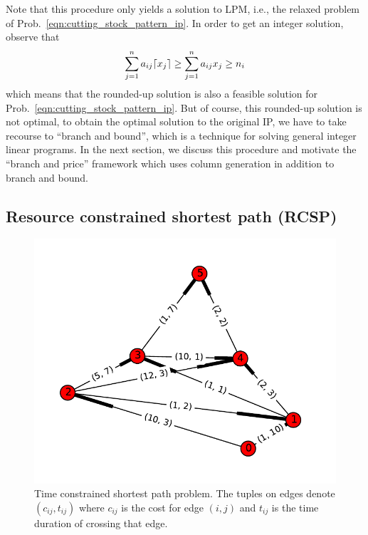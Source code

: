 \documentclass[letterpaper, 10pt, twocolumn, reqno]{amsart}
\begin{document}
Note that this procedure only yields a solution to LPM, i.e., the relaxed problem of Prob.~\eqref{eqn:cutting_stock_pattern_ip}. In order to get an integer solution, observe that
$$
\sum_{j=1}^n a_{ij} \lceil x_j\rceil \geq \sum_{j=1}^n a_{ij} x_j \geq n_i
$$
which means that the rounded-up solution is also a feasible solution for Prob.~\eqref{eqn:cutting_stock_pattern_ip}. But of course, this rounded-up solution is not optimal, to obtain the optimal solution to the original IP, we have to take recourse to ``branch and bound'', which is a technique for solving general integer linear programs. In the next section, we discuss this procedure and motivate the ``branch and price'' framework which uses column generation in addition to branch and bound.

\subsection{Resource constrained shortest path (RCSP)}
\label{ssec:rcsp}

\begin{figure}
\centering
\includegraphics[width=0.9 \columnwidth]{roadnet}
\caption{Time constrained shortest path problem. The tuples on edges denote $(c_{ij}, t_{ij})$ where $c_{ij}$ is the cost for edge $(i,j)$ and $t_{ij}$ is the time duration of crossing that edge.}
\label{fig:rcsp}
\end{figure}
\end{document}
